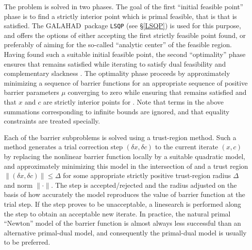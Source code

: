 \documentclass[twoside]{article}
\newcommand{\gal}{{\sf GALAHAD}}
\begin{document}
The problem is solved in two phases. The goal of the first 
``initial feasible point'' phase is
to find a strictly interior point which is primal feasible, that is that
 is satisfied. The \gal\ package {\tt LSQP} (see \S\ref{LSQP})
is used for this purpose, and offers the options of either accepting the first 
strictly feasible point found, or preferably of aiming for the
so-called ``analytic center'' of the feasible region.
Having found such a suitable initial feasible point, the second ``optimality''
phase ensures that  remains satisfied while iterating to
satisfy dual feasibility  and complementary slackness .
The optimality phase proceeds by approximately minimizing a 
sequence of barrier functions
for an appropriate sequence of positive barrier parameters $\mu$ 
converging to zero
while ensuring that  remains satisfied and that 
$x$ and $c$ are strictly interior points for . 
Note that terms in the above summations corresponding to infinite bounds are
ignored, and that equality constraints are treated specially.

Each of the barrier subproblems is solved using a trust-region method.
Such a method generates a trial correction step $(\delta x, \delta c)$
to the current iterate $(x, c)$
by replacing the nonlinear barrier function locally by a suitable 
quadratic model, and approximately minimizing this model in the 
intersection of 
and a trust region $\|( \delta x,  \delta c)\| \leq \Delta$
for some appropriate
strictly positive trust-region radius $\Delta$ and norm $\| \cdot \|$.
The step is accepted/rejected
and the radius adjusted on the basis of how accurately the model reproduces the
value of barrier function at the trial step. If the step proves to be 
unacceptable, a linesearch is performed along the step to obtain an acceptable 
new iterate. In practice, the natural primal ``Newton'' model of the barrier 
function is almost always 
less successful than an alternative primal-dual model, 
and consequently the primal-dual model is usually to be preferred.
\end{document}
